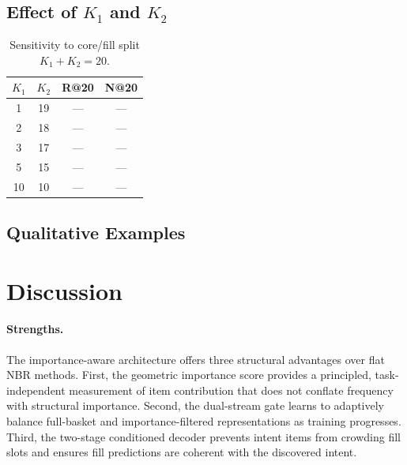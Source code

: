 \documentclass[conference]{IEEEtran}
\begin{document}
\subsection{Effect of $K_1$ and $K_2$}

\begin{table}[h]
\centering
\caption{Sensitivity to core/fill split $K_1 + K_2 = 20$.}
\label{tab:k1k2}
\begin{tabular}{cc|cc}
\toprule
$K_1$ & $K_2$ & R@20 & N@20 \\
\midrule
1  & 19 & --- & --- \\
2  & 18 & --- & --- \\
3  & 17 & --- & --- \\
5  & 15 & --- & --- \\
10 & 10 & --- & --- \\
\bottomrule
\end{tabular}
\end{table}


\subsection{Qualitative Examples}



\section{Discussion}
\label{sec:discussion}


\paragraph{Strengths.}
The importance-aware architecture offers three structural advantages over flat NBR methods. First, the geometric importance score provides a principled, task-independent measurement of item contribution that does not conflate frequency with structural importance. Second, the dual-stream gate learns to adaptively balance full-basket and importance-filtered representations as training progresses. Third, the two-stage conditioned decoder prevents intent items from crowding fill slots and ensures fill predictions are coherent with the discovered intent.
\end{document}
